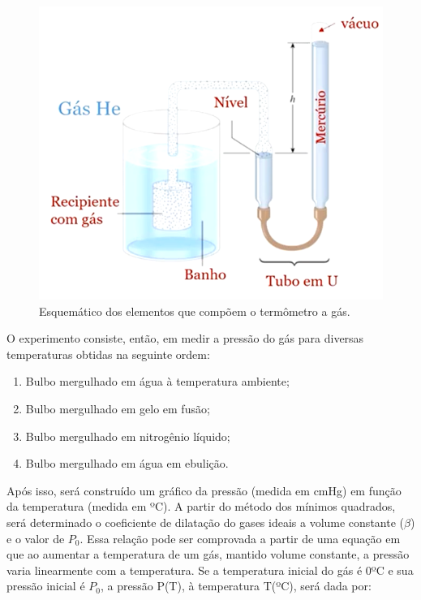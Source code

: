 \begin{figure}[H]
  \centering
  \includegraphics[scale=0.75]{images/Termômetro a Gás esquemático.png}
  \caption{Esquemático dos elementos que compõem o termômetro a gás.}
\end{figure}

O experimento consiste, então, em medir a pressão do gás para diversas temperaturas obtidas na seguinte ordem:

\begin{enumerate}
    \item Bulbo mergulhado em água à temperatura ambiente;
    \item Bulbo mergulhado em gelo em fusão;
    \item Bulbo mergulhado em nitrogênio líquido;
    \item Bulbo mergulhado em água em ebulição.
\end{enumerate}

Após isso, será construído um gráfico da pressão (medida em cmHg) em função da temperatura (medida em ºC). A partir do método dos mínimos quadrados, será determinado o coeficiente de dilatação do gases ideais a volume constante ($\beta$) e o valor de $P_0$. Essa relação pode ser comprovada a partir de uma equação em que ao aumentar a temperatura de um gás, mantido volume constante, a pressão varia linearmente com a temperatura. Se a temperatura inicial do gás é 0ºC e sua pressão inicial é $P_0$, a pressão P(T), à temperatura T(ºC), será dada por:

